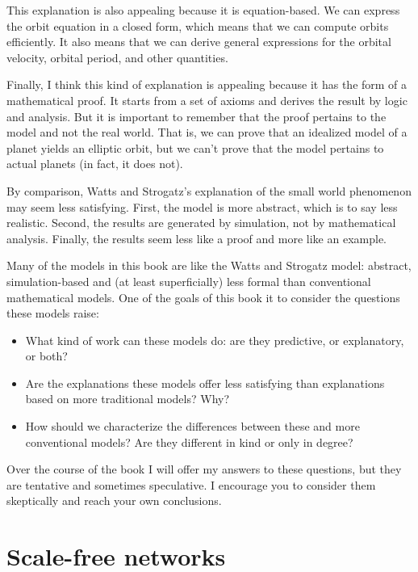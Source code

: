 \documentclass[10pt]{book}
\begin{document}
This explanation is also appealing because it is equation-based.
We can express the orbit equation in a closed form, which means
that we can compute orbits efficiently.  It also means that
we can derive general expressions for the orbital velocity,
orbital period, and other quantities.

Finally, I think this kind of explanation is appealing because
it has the form of a mathematical proof.  It starts from a
set of axioms and derives the result by logic and analysis.
But it is important to remember that the proof pertains to the
model and not the real world.  That is, we can prove that
an idealized model of a planet yields an elliptic orbit, but
we can't prove that the model pertains to actual planets (in
fact, it does not).

By comparison, Watts and Strogatz's explanation of the small
world phenomenon may seem less satisfying.  First, the model
is more abstract, which is to say less realistic.  Second,
the results are generated by simulation, not by mathematical
analysis.  Finally, the results seem less like a proof and
more like an example.

Many of the models in this book are like the Watts and
Strogatz model: abstract, simulation-based and (at least
superficially) less formal than conventional mathematical 
models.  One of the goals of this book it to consider the
questions these models raise:

\begin{itemize}

\item What kind of work can these models do: are they predictive, or
  explanatory, or both?

\item Are the explanations these models offer less satisfying than
  explanations based on more traditional models?  Why?

\item How should we characterize the differences between these and
  more conventional models?  Are they different in kind or only in
  degree?

\end{itemize}

Over the course of the book I will offer my answers
to these questions, but they are tentative and sometimes
speculative.  I encourage you to consider them skeptically
and reach your own conclusions.





\chapter{Scale-free networks}
\end{document}
